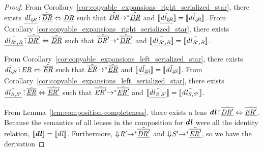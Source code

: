 \documentclass[numbers]{sigplanconf}
\begin{document}
\begin{proof}
  From Corollary~\ref{cor:copyable_expansions_right_serialized_star}, there
  exists $\underline{\tilde{\mathit{dl}_{\Downarrow\mkern-4mu \mathit{R}}}}
  \,\tilde{:}\, \underline{\tilde{\overline{\mathit{DR}}}}
  \Leftrightarrow \underline{\mathit{DR}}$ such that $\tilde{\overline{\mathit{DR}}}
  {\rightarrow}^* \underline{\tilde{\overline{\mathit{DR}}}}$ and
  $[ \! [\underline{\tilde{\mathit{dl}_{\Downarrow\mkern-4mu \mathit{R}}}}] \! ] =
  [ \! [\tilde{\mathit{dl}_{\Downarrow\mkern-4mu \mathit{R}}}] \! ]$.
  From Corollary~\ref{cor:copyable_expansions_right_serialized_star}, there
  exists $\underline{\tilde{\mathit{dl}_{\mathit{R}',\mathit{R}}}}
  \,\tilde{:}\, \underline{\tilde{\overline{\mathit{DR}'}}}
  \Leftrightarrow \underline{\tilde{\overline{\mathit{DR}}}}$
  such that $\tilde{\overline{\mathit{DR}'}}
  {\rightarrow}^* \underline{\tilde{\overline{\mathit{DR}'}}}$ and
  $[ \! [\underline{\tilde{\mathit{dl}_{\mathit{R}',\mathit{R}}}}] \! ] =
  [ \! [\tilde{\mathit{dl}_{\mathit{R}',\mathit{R}}}] \! ]$.
  
  From Corollary~\ref{cor:copyable_expansions_left_serialized_star}, there
  exists $\underline{\tilde{\mathit{dl}_{\Downarrow\mkern-4mu \mathit{S}}}}
  \,\tilde{:}\, \underline{\mathit{ER}}
  \Leftrightarrow \underline{\tilde{\overline{\mathit{ER}}}}$ such that
  $\tilde{\overline{\mathit{ER}}}
  {\rightarrow}^* \underline{\tilde{\overline{\mathit{ER}}}}$ and
  $[ \! [\underline{\tilde{\mathit{dl}_{\Downarrow\mkern-4mu \mathit{S}}}}] \! ] =
  [ \! [\tilde{\mathit{dl}_{\Downarrow\mkern-4mu \mathit{S}}}] \! ]$.
  From Corollary~\ref{cor:copyable_expansions_left_serialized_star}, there
  exists $\underline{\tilde{\mathit{dl}_{\mathit{S},\mathit{S}'}}}
  \,\tilde{:}\, \underline{\tilde{\overline{\mathit{ER}}}}
  \Leftrightarrow \underline{\tilde{\overline{\mathit{ER}'}}}$
  such that $\tilde{\overline{\mathit{ER}'}}
  {\rightarrow}^* \underline{\tilde{\overline{\mathit{ER}'}}}$ and
  $[ \! [\underline{\tilde{\mathit{dl}_{\mathit{S},\mathit{S}'}}}] \! ] =
  [ \! [\tilde{\mathit{dl}_{\mathit{S},\mathit{S}'}}] \! ]$.

  From Lemma~\ref{lem:composition-completeness}, there exists a lens
  $\boldsymbol{\mathit{dl}} \,\tilde{:}\,
  \underline{\tilde{\overline{\mathit{DR}'}}} \Leftrightarrow
  \underline{\tilde{\overline{\mathit{ER}'}}}$.  Because the semantics of all
  lenses in the composition for $\boldsymbol{\mathit{dl}}$ were all the identity
  relation, $[ \! [\boldsymbol{\mathit{dl}}] \! ] = [ \! [\mathit{dl}] \! ]$.
  Furthermore,
  $\Downarrow\mkern-4mu \mathit{R}' {\rightarrow}^*
  \underline{\tilde{\overline{\mathit{DR}'}}}$
  and
  $\Downarrow\mkern-4mu \mathit{S}' {\rightarrow}^*
  \underline{\tilde{\overline{\mathit{ER}'}}}$, so we have the derivation
  

\end{proof}
\end{document}
